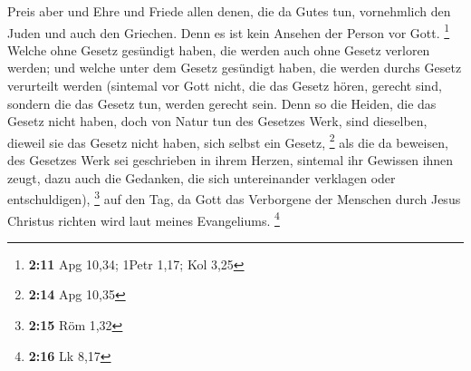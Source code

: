  Preis aber und Ehre und Friede allen denen, die da Gutes
tun, vornehmlich den Juden und auch den Griechen.  Denn es
ist kein Ansehen der Person vor Gott. \footnote{\textbf{2:11} Apg 10,34;
  1Petr 1,17; Kol 3,25}  Welche ohne Gesetz gesündigt
haben, die werden auch ohne Gesetz verloren werden; und welche unter dem
Gesetz gesündigt haben, die werden durchs Gesetz verurteilt werden
 (sintemal vor Gott nicht, die das Gesetz hören, gerecht
sind, sondern die das Gesetz tun, werden gerecht sein. 
Denn so die Heiden, die das Gesetz nicht haben, doch von Natur tun des
Gesetzes Werk, sind dieselben, dieweil sie das Gesetz nicht haben, sich
selbst ein Gesetz, \footnote{\textbf{2:14} Apg 10,35}  als
die da beweisen, des Gesetzes Werk sei geschrieben in ihrem Herzen,
sintemal ihr Gewissen ihnen zeugt, dazu auch die Gedanken, die sich
untereinander verklagen oder entschuldigen), \footnote{\textbf{2:15} Röm
  1,32}  auf den Tag, da Gott das Verborgene der Menschen
durch Jesus Christus richten wird laut meines Evangeliums. \footnote{\textbf{2:16}
  Lk 8,17}

